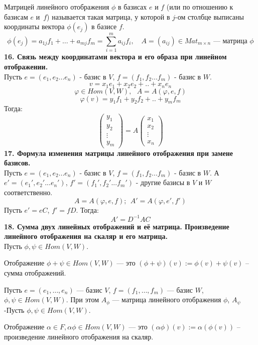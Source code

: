 \documentclass{article}
\begin{document}
Матрицей линейного отображения $\phi$ в базисах $e$ и $f$ (или по отношению к базисам $e$ и~$f$) называется такая матрица, у которой в $j$-ом столбце выписаны координаты вектора $\phi(e_j)$ в базисе $f$.
\[
\phi(e_j) = a_{1j}f_1 + \ldots + a_{mj}f_m = \sum_{i = 1}^{m}a_{ij}f_i, \quad A = (a_{ij}) \in Mat_{m\times n} \text{ --- матрица $\phi$}
\]
\newline
\newline
\textbf{16. Связь между координатами вектора и его образа при линейном отображении.}\\
Пусть $e = (e_1, e_2...e_n)$ - базис в $V$, $f = (f_1, f_2...f_m)$ - базис в $W$. 
$$v = x_1e_1+x_2e_2+..+x_ne_n$$
$$\varphi \in Hom(V,W),~~~A=A(\varphi, e, f)$$
$$\varphi(v)=y_1f_1+y_2f_2+..+y_mf_m$$
Тогда:
$$\begin{pmatrix} y_1\\y_2\\\vdots\\y_m\end{pmatrix}=A\begin{pmatrix}x_1\\x_2\\\vdots\\x_n\end{pmatrix}
$$
\newline
\newline
\textbf{17. Формула изменения матрицы линейного отображения при замене базисов.}\\
Пусть $e = (e_1, e_2...e_n)$ - базис в $V$, $f = (f_1, f_2...f_m)$ - базис в $W$. А $e' = (e_1', e_2'...e_n')$, $f' = (f_1', f_2'...f_m')$ - другие базисы в $V$ и $W$ соответственно.
$$A=A(\varphi,e,f);~~A'=A(\varphi, e', f')$$
Пусть $e'=eC$, $f'=fD$. Тогда:
$$A'=D^{-1}AC$$
\newline
\newline
\textbf{18. Сумма двух линейных отображений и её матрица. Произведение линейного отображения на скаляр и его
матрица.}\\
Пусть $\phi, \psi \in Hom(V, W)$.

Отображение $\phi + \psi \in Hom(V, W)$ --- это $(\phi + \psi)(v):= \phi(v) + \psi(v)$ -- сумма отображений.

Пусть $e = (e_1, \ldots, e_n)$ --- базис $V$, $f = (f_1, \ldots, f_m)$ --- базис $W$, $\phi, \psi \in Hom(V, W)$. При этом $A_{\phi}$ --- матрица линейного отображения $\phi$, $A_{\psi}$ -Пусть $\phi, \psi \in Hom(V, W)$.

Отображение $\alpha \in F, \alpha\phi \in Hom(V, W)$ --- это $(\alpha\phi)(v) := \alpha(\phi(v))$ -- произведение линейного отображения на скаляр.
\end{document}
